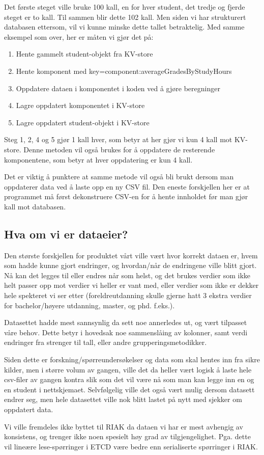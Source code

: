 Det første steget ville bruke 100 kall, en for hver student, det tredje og fjerde steget er to kall. Til sammen blir dette 102 kall. Men siden vi har strukturert databasen ettersom, vil vi kunne minske dette tallet betraktelig. Med samme eksempel som over, her er måten vi gjør det på:

\begin{enumerate}
  \item Hente gammelt student-objekt fra KV-store
  \item Hente komponent med key=component:averageGradesByStudyHours
  \item Oppdatere dataen i komponentet i koden ved å gjøre beregninger
  \item Lagre oppdatert komponentet i KV-store
  \item Lagre oppdatert student-objekt i KV-store
\end{enumerate}

Steg 1, 2, 4 og 5 gjør 1 kall hver, som betyr at her gjør vi kun 4 kall mot KV-store. Denne metoden vil også brukes for å oppdatere de resterende komponentene, som betyr at hver oppdatering er kun 4 kall.

Det er viktig å punktere at samme metode vil også bli brukt dersom man oppdaterer data ved å laste 
opp en ny CSV fil. Den eneste forskjellen her er at programmet må først dekonstruere CSV-en for å hente innholdet før man gjør kall mot databasen.

\subsection{Hva om vi er dataeier?}
Den største forskjellen for produktet vårt ville vært hvor korrekt dataen er, hvem som hadde kunne gjort endringer, og hvordan/når de endringene ville blitt gjort. Nå kan det legges til eller endres når som helst, og det brukes verdier som ikke helt passer opp mot verdier vi heller er vant med, eller verdier som ikke er dekker hele spekteret vi ser etter (foreldreutdanning skulle gjerne hatt 3 ekstra verdier for bachelor/høyere utdanning, master, og phd. f.eks.).

Datasettet hadde mest sannsynlig da sett noe annerledes ut, og vært tilpasset våre behov. Dette betyr i hovedsak noe sammenslåing av kolonner, samt verdi endringer fra strenger til tall, eller andre grupperingsmetodikker.

Siden dette er forskning/spørreundersøkelser og data som skal hentes inn fra sikre kilder, men i større volum av gangen, ville det da heller vært logisk å laste hele csv-filer av gangen kontra slik som det vil være nå som man kan legge inn en og en student i nettskjemaet. Selvfølgelig ville det også vært mulig dersom datasett endrer seg, men hele datasettet ville nok blitt lastet på nytt med sjekker om oppdatert data.

Vi ville fremdeles ikke byttet til RIAK da dataen vi har er mest avhengig av konsistens, og trenger ikke noen spesielt høy grad av tilgjengelighet. Pga. dette vil lineære lese-spørringer i ETCD være bedre enn serialiserte spørringer i RIAK.



